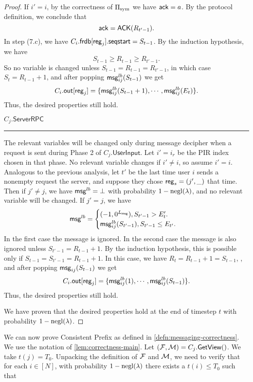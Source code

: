 \begin{proof}
If $i' = i$, by the correctness of $\Pi_{\text{sym}}$ we have $\mathsf{ack} = a$. By the protocol definition, we conclude that
$$\mathsf{ack} = \mathsf{ACK}(R_{t' - 1}).$$
In step (7.c), we have $C_i.\mathsf{frdb}[\mathsf{reg}_j].\mathsf{seqstart} = S_{t - 1}$. By the induction hypothesis, we have
$$S_{t - 1} \geq R_{t - 1} \geq R_{t' - 1}.$$
So no variable is changed unless $S_{t - 1} = R_{t - 1} = R_{t' - 1}$, in which case $S_t = R_{t - 1} + 1$, and after popping $\mathsf{msg}^{lb}_{ij}(S_{t - 1})$ we get
$$C_i.\mathsf{out}[\mathsf{reg}_j] = \{\mathsf{msg}^{lb}_{ij}(S_{t - 1} + 1), \cdots, \mathsf{msg}^{lb}_{ij}(E_t)\}.$$
Thus, the desired properties still hold.

\vspace{10pt}
$C_j.\mathsf{ServerRPC}$
\hrule
The relevant variables will be changed only during message decipher when a request is sent during Phase 2 of $C_j.\mathsf{UserInput}$. Let $i' = i_r$ be the PIR index chosen in that phase. No relevant variable changes if $i' \neq i$, so assume $i' = i$. Analogous to the previous analysis, let $t'$ be the last time user $i$ sends a nonempty request the server, and suppose they chose $\mathsf{reg}_s = (j', \_)$ that time. Then
if $j' \neq j$, we have $\mathsf{msg}^{lb} = \bot$ with probability $1 - \operatorname{negl}(\lambda)$, and no relevant variable will be changed. If $j' = j$, we have
$$\mathsf{msg}^{lb} = \begin{cases}
(-1, 0^{L_{\mathsf{msg}}}), S_{t' - 1} > E_t'. \\
\mathsf{msg}_{ij}^{lb}(S_{t' - 1}), S_{t' - 1} \leq E_{t'}. 
\end{cases}$$
In the first case the message is ignored. In the second case the message is also ignored unless $S_{t' - 1} = R_{t - 1} + 1$. By the induction hypothesis, this is possible only if $S_{t - 1} = S_{t' - 1} = R_{t - 1} + 1$. In this case, we have $R_t = R_{t - 1} + 1 = S_{t - 1}$, , and after popping $\mathsf{msg}_{ij}(S_{t - 1})$ we get
$$C_i.\mathsf{out}[\mathsf{reg}_j] = \{\mathsf{msg}^{lb}_{ij}(1), \cdots, \mathsf{msg}^{lb}_{ij}(S_{t - 1})\}.$$
Thus, the desired properties still hold.

We have proven that the desired properties hold at the end of timestep $t$ with probability $1 - \operatorname{negl}(\lambda)$.
\end{proof}
We can now prove Consistent Prefix as defined in \cref{defn:messaging-correctness}. We use the notation of \cref{lem:correctness-main}. Let $(\mathcal{F}, \mathcal{M}) = C_j.\mathsf{GetView}()$. We take $t(j) = T_0$. Unpacking the definition of $\mathcal{F}$ and $\mathcal{M}$, we need to verify that for each $i \in [N]$, with probability $1 - \operatorname{negl}(\lambda)$ there exists a $t(i) \leq T_0$ such that
 
